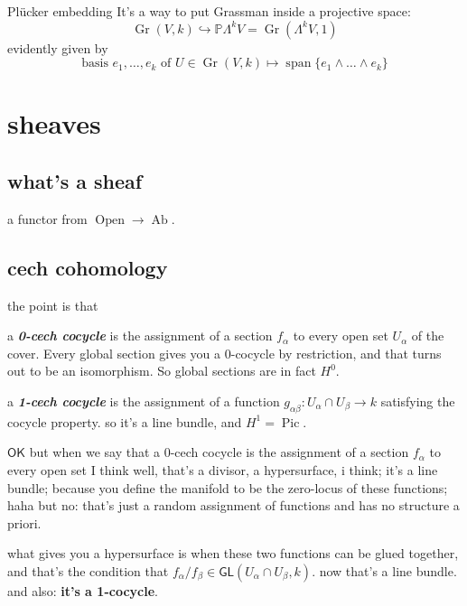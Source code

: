 \begin{thing7}{Plücker embedding}\leavevmode
It's a way to put Grassman inside a projective space:
\[\operatorname{Gr}(V,k) \hookrightarrow \mathbb{P}\Lambda^{k}V = \operatorname{Gr}(\Lambda^{k}V,1)\]
evidently given by
\[\text{basis } e_1,\ldots,e_k\text{ of \(U \in \operatorname{Gr}(V,k)\)}\longmapsto \operatorname{span}\{e_1 \wedge \ldots \wedge e_k\}\]


\end{thing7}




\section{sheaves}

\subsection{what's a sheaf}
a functor from \(\operatorname{Open} \to \operatorname{Ab} \).

\subsection{cech cohomology}

the point is that

a \textit{\textbf{0-cech cocycle}} is the assignment of a section \(f_\alpha\) to every open set \(U_\alpha\) of the cover. Every global section gives you a \(0\)-cocycle by restriction, and that turns out to be an isomorphism. So global sections are in fact \(H^0\).

a  \textit{\textbf{1-cech cocycle}} is the assignment of a function \(g_{\alpha \beta}:U_\alpha \cap U_\beta \to k\) satisfying the cocycle property. so it's a line bundle, and \(H^1=\operatorname{Pic}\).

\begin{question}\leavevmode
\(\mathsf{OK}\) but when we say that a 0-cech cocycle is the assignment of a section \(f_\alpha\) to every open set I think well, that's a divisor, a hypersurface, i think; it's a line bundle; because you define the manifold to be the zero-locus of these functions; haha but no: that's just a random assignment of functions and has no structure a priori.

what gives you a hypersurface is when these two functions can be glued together, and that's the condition that \(f_\alpha/f_\beta \in \mathsf{GL}(U_\alpha \cap U_\beta,k)\). now that's a line bundle. and also: \textbf{it's a {\color{2}1}-cocycle}.
\end{question}

